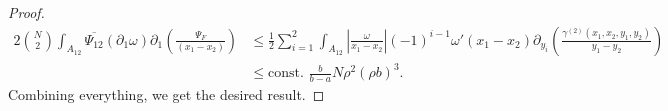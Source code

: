 \documentclass[a4paper,11pt]{article}
\newcommand{\abs}[1]{\left\lvert #1 \right\rvert}
\numberwithin{equation}{section}
\begin{document}
\begin{proof}
\begin{equation}
		\begin{aligned}
		2\binom{N}{2}\int_{A_{12}}\overline{\Psi_{12}}(\partial_1\omega)\partial_1\left(\frac{\Psi_F}{(x_1-x_2)}\right)&\leq\frac12\sum_{i=1}^{2}\int_{A_{12}}\abs{\frac{\omega}{x_1-x_2}}(-1)^{i-1}\omega'(x_1-x_2)\partial_{y_i}\left(\frac{\gamma^{(2)}(x_1,x_2,y_1,y_2)}{y_1-y_2}\right)\\
		&\leq \text{const. }\frac{b}{b-a}N\rho^2(\rho b)^3.
		\end{aligned}
		\end{equation}
		Combining everything, we get the desired result.

	\end{proof}
\end{document}
